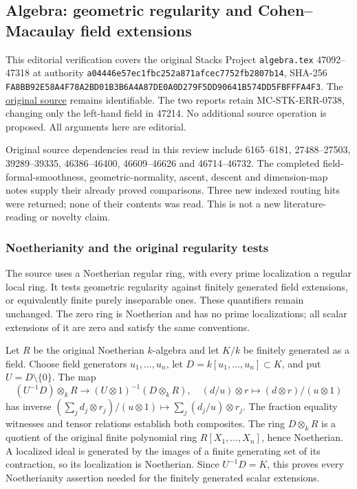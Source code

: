 \subsection{Algebra: geometric regularity and Cohen--Macaulay field extensions}\label{algebra-proof-071-algebra-geometric-regularity-and-cohenmacaulay-field-extensions}

This editorial verification covers the original Stacks Project \texttt{algebra.tex} 47092--47318 at authority \texttt{a04446e57ec1fbc252a871afcec7752fb2807b14}, SHA-256 \texttt{FA8BB92E58A4F78A2BD01B3B6A4A87DE0A0D279F5DD90641B574DD5FBFFFA4F3}. The \href{https://github.com/stacks/stacks-project/blob/a04446e57ec1fbc252a871afcec7752fb2807b14/algebra.tex\#L47092}{original source} remains identifiable. The two reports retain MC-STK-ERR-0738, changing only the left-hand field in 47214. No additional source operation is proposed. All arguments here are editorial.

Original source dependencies read in this review include 6165--6181, 27488--27503, 39289--39335, 46386--46400, 46609--46626 and 46714--46732. The completed field-formal-smoothness, geometric-normality, ascent, descent and dimension-map notes supply their already proved comparisons. Three new indexed routing hits were returned; none of their contents was read. This is not a new literature-reading or novelty claim.

\subsubsection{Noetherianity and the original regularity tests}\label{algebra-proof-071-noetherianity-and-the-original-regularity-tests}

The source uses a Noetherian regular ring, with every prime localization a regular local ring. It tests geometric regularity against finitely generated field extensions, or equivalently finite purely inseparable ones. These quantifiers remain unchanged. The zero ring is Noetherian and has no prime localizations; all scalar extensions of it are zero and satisfy the same conventions.

Let \(R\) be the original Noetherian \(k\)-algebra and let \(K/k\) be finitely generated as a field. Choose field generators \(u_1,\ldots,u_n\), let \(D=k[u_1,\ldots,u_n]\subset K\), and put \(U=D\setminus\{0\}\). The map \[
 (U^{-1}D)\otimes_kR\longrightarrow(U\otimes1)^{-1}(D\otimes_kR),
 \quad(d/u)\otimes r\longmapsto(d\otimes r)/(u\otimes1)
\] has inverse \((\sum_jd_j\otimes r_j)/(u\otimes1)\mapsto\sum_j(d_j/u)\otimes r_j\). The fraction equality witnesses and tensor relations establish both composites. The ring \(D\otimes_kR\) is a quotient of the original finite polynomial ring \(R[X_1,\ldots,X_n]\), hence Noetherian. A localized ideal is generated by the images of a finite generating set of its contraction, so its localization is Noetherian. Since \(U^{-1}D=K\), this proves every Noetherianity assertion needed for the finitely generated scalar extensions.

